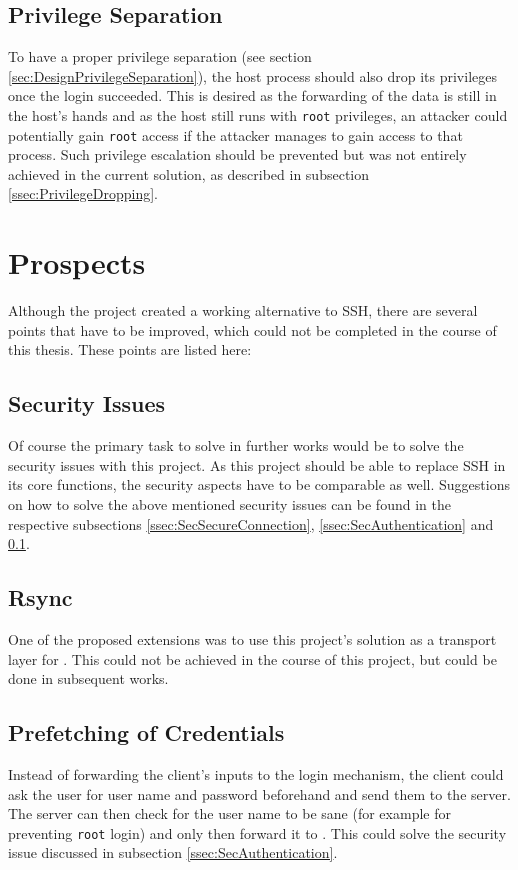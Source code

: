 \documentclass[10pt,a4paper,titlepage,twoside,english,final]{zhawreprt}
\begin{document}
\subsection{Privilege Separation}\label{ssec:SecPrivilegeSeparation}
To have a proper privilege separation (see section \ref{sec:DesignPrivilegeSeparation}), the host process should also drop its privileges once the \gls{login} succeeded.
This is desired as the forwarding of the data is still in the host's hands and as the host still runs with \texttt{root} privileges, an attacker could potentially gain \texttt{root} access if the attacker manages to gain access to that process.
Such privilege escalation should be prevented but was not entirely achieved in the current solution, as described in subsection \ref{ssec:PrivilegeDropping}.


\section{Prospects}\label{sec:Prospects}
Although the project created a working alternative to \gls{SSH}, there are several points that have to be improved, which could not be completed in the course of this thesis.
These points are listed here:

\subsection{Security Issues}\label{ssec:SecurityIssues}
Of course the primary task to solve in further works would be to solve the security issues with this project.
As this project should be able to replace \gls{SSH} in its core functions, the security aspects have to be comparable as well.
Suggestions on how to solve the above mentioned security issues can be found in the respective subsections \ref{ssec:SecSecureConnection}, \ref{ssec:SecAuthentication} and \ref{ssec:SecPrivilegeSeparation}.

\subsection{Rsync}\label{ssec:Rsync}
One of the proposed extensions was to use this project's solution as a transport layer for \cite{rsync}.
This could not be achieved in the course of this project, but could be done in subsequent works.

\subsection{Prefetching of Credentials}\label{ssec:PrefetchingOfCredentials}
Instead of forwarding the client's inputs to the \gls{login} mechanism, the client could ask the user for user name and password beforehand and send them to the server.
The server can then check for the user name to be sane (for example for preventing \texttt{root} login) and only then forward it to \cite{login}.
This could solve the security issue discussed in subsection \ref{ssec:SecAuthentication}.
\end{document}
